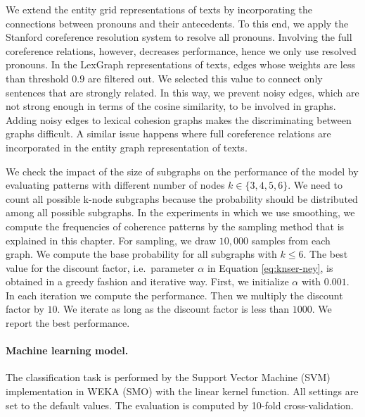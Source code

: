 We extend the entity grid representations of texts by incorporating the connections between pronouns and their antecedents. 
To this end, we apply the Stanford coreference resolution system \cite{leeheeyoung13} to resolve all pronouns. 
Involving the full coreference relations, however, decreases performance, hence we only use resolved pronouns. 
In the LexGraph representations of texts, edges whose weights are less than threshold $0.9$ are filtered out. 
We selected this value to connect only sentences that are strongly related. 
In this way, we prevent noisy edges, which are not strong enough in terms of the cosine similarity, to be involved in graphs. 
Adding noisy edges to lexical cohesion graphs makes the discriminating between graphs difficult.
A similar issue happens where full coreference relations are incorporated in the entity graph representation of texts.   

We check the impact of the size of subgraphs on the performance of the model by evaluating patterns with different number of nodes $k \in \lbrace3,4,5,6\rbrace$. 
We need to count all possible k-node subgraphs because the probability should be distributed among all possible subgraphs.  
In the experiments in which we use smoothing, we compute the frequencies of coherence patterns by the sampling method that is explained in this chapter.  
For sampling, we draw $10,000$ samples from each graph. 
We compute the base probability for all subgraphs with $k \leq 6$.  
The best value for the discount factor, i.e.\ parameter $\alpha$ in Equation \ref{eq:knser-ney}, is obtained in a greedy fashion and iterative way.   
First, we initialize $\alpha$ with $0.001$. 
In each iteration we compute the performance. 
Then we multiply the discount factor by $10$. 
We iterate as long as the discount factor is less than $1000$. 
We report the best performance.
 
\paragraph{Machine learning model.}
The classification task is performed by the Support Vector Machine (SVM) implementation in WEKA (SMO) with the linear kernel function.  
All settings are set to the default values. 
The evaluation is computed by \mbox{10-fold} \mbox{cross-validation}. 

